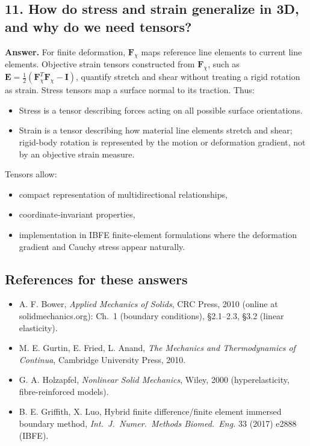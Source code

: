 \documentclass[12pt]{article}
\begin{document}
\subsection*{11. How do stress and strain generalize in 3D, and why do we need tensors?}

\textbf{Answer.}
For finite deformation, $\mathbf F_{\chi}$ maps reference line elements to current line elements. Objective strain tensors constructed from $\mathbf F_{\chi}$, such as $\mathbf E=\tfrac12(\mathbf F_{\chi}^T\mathbf F_{\chi}-\mathbf I)$, quantify stretch and shear without treating a rigid rotation as strain. Stress tensors map a surface normal to its traction. Thus:
\begin{itemize}
    \item Stress is a tensor describing forces acting on all possible surface orientations.
    \item Strain is a tensor describing how material line elements stretch and shear; rigid-body rotation is represented by the motion or deformation gradient, not by an objective strain measure.
\end{itemize}

Tensors allow:
\begin{itemize}
    \item compact representation of multidirectional relationships,
    \item coordinate-invariant properties,
    \item implementation in IBFE finite-element formulations where the deformation gradient and Cauchy stress appear naturally.
\end{itemize}

\subsection*{References for these answers}
\begin{itemize}
    \item A. F. Bower, \emph{Applied Mechanics of Solids}, CRC Press, 2010 (online at solidmechanics.org): Ch.~1 (boundary conditions), \S2.1--2.3, \S3.2 (linear elasticity).
    \item M. E. Gurtin, E. Fried, L. Anand, \emph{The Mechanics and Thermodynamics of Continua}, Cambridge University Press, 2010.
    \item G. A. Holzapfel, \emph{Nonlinear Solid Mechanics}, Wiley, 2000 (hyperelasticity, fibre-reinforced models).
    \item B. E. Griffith, X. Luo, Hybrid finite difference/finite element immersed boundary method, \emph{Int.\ J.\ Numer.\ Methods Biomed.\ Eng.} 33 (2017) e2888 (IBFE).
\end{itemize}

\end{document}
